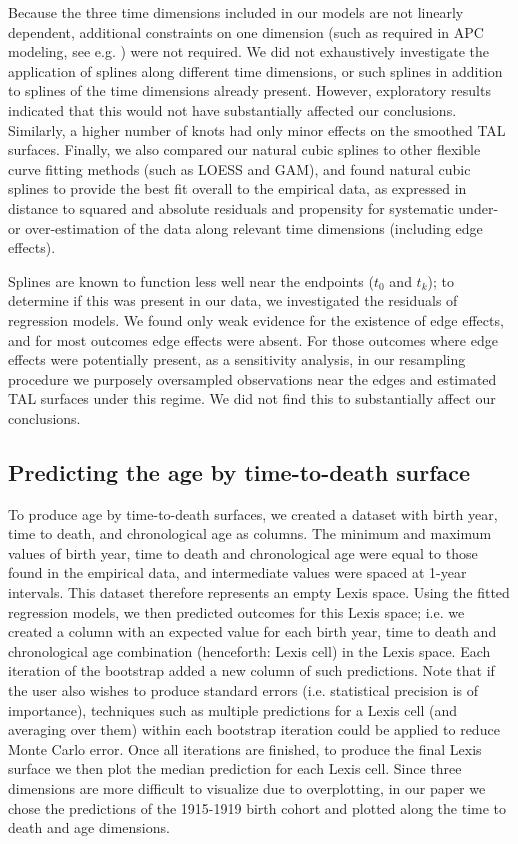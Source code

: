 \documentclass[12pt,oneside,a4paper]{article} %
\begin{document}
\begin{appendices}
Because the three time dimensions included in our models are not linearly
dependent, additional constraints on one dimension (such as required in APC
modeling, see e.g. \citet{clayton1987models}) were not required. We did not exhaustively investigate the application of splines along different time dimensions, or such splines in addition to splines of the time dimensions already present. However, exploratory results indicated that this would not have substantially affected our conclusions. Similarly, a higher number of knots had only minor effects on the smoothed TAL surfaces. Finally, we also compared our natural cubic splines to other flexible curve fitting methods (such as LOESS and GAM), and found natural cubic splines to provide the best fit overall to the empirical data, as expressed in distance to squared and absolute residuals and propensity for systematic under- or over-estimation of the data along relevant time dimensions (including edge effects).

Splines are known to function less well near the endpoints ($t_0$ and $t_k$); to determine if this was present in our data, we investigated the residuals of regression models. We found only weak evidence for the existence of edge effects, and for most outcomes edge effects were absent. For those outcomes where edge effects were potentially present, as a sensitivity analysis, in our resampling procedure we purposely oversampled observations near the edges and estimated TAL surfaces under this regime. We did not find this to substantially affect our conclusions. 

\subsection{Predicting the age by time-to-death surface}
To produce age by time-to-death surfaces, we created a dataset with birth year,
time to death, and chronological age as columns. The minimum and maximum values of birth year, time to death and chronological age were equal to those found in the empirical data, and intermediate values were spaced at 1-year intervals. This dataset therefore represents an empty Lexis space. Using the fitted regression models, we then predicted outcomes for this Lexis space; i.e. we created a column with an expected value for each birth year, time to death and chronological age combination (henceforth: Lexis cell) in the Lexis space. Each iteration of the bootstrap added a new column of such predictions. Note that if the user also wishes to produce standard errors (i.e. statistical precision is of importance), techniques such as multiple predictions for a Lexis cell (and averaging over them) within each bootstrap iteration could be applied to reduce Monte Carlo error. Once all iterations are finished, to produce the final Lexis surface we then plot the median prediction for each Lexis cell. Since three dimensions are more difficult to visualize due to overplotting, in our paper we chose the predictions of the 1915-1919 birth cohort and plotted along the time to death and age dimensions.


\end{appendices}
\end{document}
